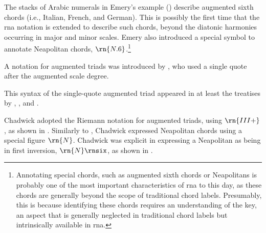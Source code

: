


The stacks of Arabic numerals in Emery's example
() describe
augmented sixth chords (i.e., Italian, French, and German).
This is possibly the first time that the \gls{rna} notation
is extended to describe such chords, beyond the diatonic
harmonies occurring in major and minor scales. Emery also
introduced a special symbol to annotate Neapolitan chords,
$\rn{N.6}$.\footnote{Annotating special chords, such as
augmented sixth chords or Neapolitans is probably one of the
most important characteristics of \gls{rna} to this day, as
these chords are generally beyond the scope of traditional
chord labels. Presumably, this is because identifying these
chords requires an understanding of the key, an aspect that
is generally neglected in traditional chord labels but
intrinsically available in \gls{rna}.}

A notation for augmented triads was introduced by
\textcite{jadassohn1883lehrbuch}, who used a single quote
after the augmented scale degree.


This syntax of the single-quote augmented triad appeared in
at least the treatises by \textcite{broekhoven1889system},
\textcite{buwa1893schule}, and
\textcite{shepard1896harmony}.




Chadwick adopted the Riemann notation for augmented triads,
using $\rn{III+}$, as shown in
.  Similarly
to \textcite{emery1879elements}, Chadwick expressed
Neapolitan chords using a special figure $\rn{N}$. Chadwick
was explicit in expressing a Neapolitan as being in first
inversion, $\rn{N}\rnsix$, as shown in
.